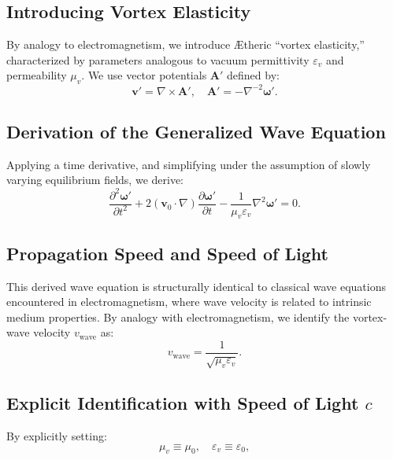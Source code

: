 \subsection{Introducing Vortex Elasticity}


By analogy to electromagnetism, we introduce Ætheric ``vortex elasticity,'' characterized by parameters analogous to vacuum permittivity $\varepsilon_v$ and permeability $\mu_v$. We use vector potentials $\mathbf{A}'$ defined by:
\begin{equation}
    \mathbf{v}' = \nabla \times \mathbf{A}', \quad \mathbf{A}' = -\nabla^{-2}\boldsymbol{\omega}'.
\end{equation}


\subsection{Derivation of the Generalized Wave Equation}


Applying a time derivative, and simplifying under the assumption of slowly varying equilibrium fields, we derive:
\begin{equation}
    \frac{\partial^2 \boldsymbol{\omega}'}{\partial t^2}+2(\mathbf{v}_0\cdot\nabla)\frac{\partial\boldsymbol{\omega}'}{\partial t} - \frac{1}{\mu_v \varepsilon_v}\nabla^2 \boldsymbol{\omega}' = 0.
\end{equation}


\subsection{Propagation Speed and Speed of Light}


This derived wave equation is structurally identical to classical wave equations encountered in electromagnetism, where wave velocity is related to intrinsic medium properties. By analogy with electromagnetism, we identify the vortex-wave velocity $v_\text{wave}$ as:
\begin{equation}
    v_\text{wave} = \frac{1}{\sqrt{\mu_v \varepsilon_v}}.
\end{equation}


\subsection{Explicit Identification with Speed of Light $c$}


By explicitly setting:
\begin{equation}
    \mu_v \equiv \mu_0, \quad \varepsilon_v \equiv \varepsilon_0,
\end{equation}


